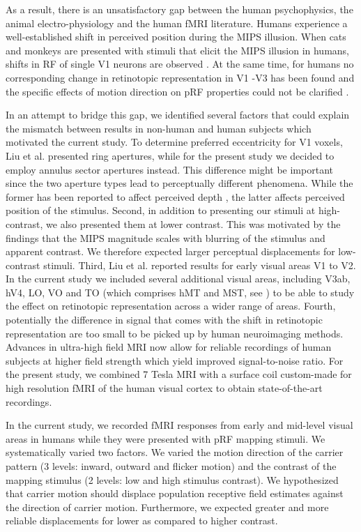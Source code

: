 As a result, there is an unsatisfactory gap between the human psychophysics, the animal electro-physiology and the human fMRI literature. Humans experience a well-established shift in perceived position during the MIPS illusion. When cats and monkeys are presented with stimuli that elicit the MIPS illusion in humans, shifts in RF of single V1 neurons are observed \parencite{Fu2004, Sundberg2006}. At the same time, for humans no corresponding change in retinotopic representation in V1 -V3 has been found \parencite{Liu2006} and the specific effects of motion direction on pRF properties could not be clarified \parencite{Harvey2016}.

In an attempt to bridge this gap, we identified several factors that could explain the mismatch between results in non-human and human subjects which motivated the current study. To determine preferred eccentricity for V1 voxels, Liu et al. \parencite*{Liu2006} presented ring apertures, while for the present study we decided to employ annulus sector apertures instead. This difference might be important since the two aperture types lead to perceptually different phenomena. While the former has been reported to affect perceived depth \parencite{Edwards2003}, the latter affects perceived position of the stimulus. Second, in addition to presenting our stimuli at high-contrast, we also presented them at lower contrast. This was motivated by the findings that the MIPS magnitude scales with blurring of the stimulus and apparent contrast. We therefore expected larger perceptual displacements for low-contrast stimuli. Third, Liu et al. \parencite*{Liu2006} reported results for early visual areas V1 to V2. In the current study we included several additional visual areas, including V3ab, hV4, LO, VO and TO (which comprises hMT and MST, see \cite{Amano2009}) to be able to study the effect on retinotopic representation across a wider range of areas. Fourth, potentially the difference in signal that comes with the shift in retinotopic representation are too small to be picked up by human neuroimaging methods. Advances in ultra-high field MRI \parencite{Ugurbil2003} now allow for reliable recordings of human subjects at higher field strength which yield improved signal-to-noise ratio. For the present study, we combined 7 Tesla MRI with a surface coil custom-made for high resolution fMRI of the human visual cortex \parencite{Sengupta2016} to obtain state-of-the-art recordings.

In the current study, we recorded fMRI responses from early and mid-level visual areas in humans while they were presented with pRF mapping stimuli. We systematically varied two factors. We varied the motion direction of the carrier pattern (3 levels: inward, outward and flicker motion) and the contrast of the mapping stimulus (2 levels: low and high stimulus contrast). We hypothesized that carrier motion should displace population receptive field estimates against the direction of carrier motion. Furthermore, we expected greater and more reliable displacements for lower as compared to higher contrast.


